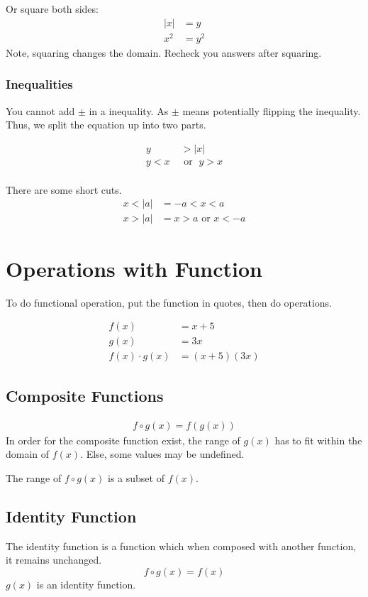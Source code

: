 \documentclass[../notes.tex]{subfiles}
\begin{document}
Or square both sides:
\begin{align*}
	|x| &= y \\
	x^2 &= y^2
\end{align*}
Note, squaring changes the domain. 
Recheck you answers after squaring.

\subsubsection{Inequalities}
You cannot add $\pm$ in a inequality.
As $\pm$ means potentially flipping the inequality.
Thus, we split the equation up into two parts.

\begin{align*}
	y &> |x| \\ 
	y < x \; &\textrm{ or } \; y > x \\
\end{align*} 

There are some short cuts.
\begin{align}
	x < |a| &= -a < x < a \\
	x > |a| &= x > a \textrm{ or } x < -a 
\end{align} 

\section{Operations with Function}
To do functional operation, put the function in quotes, then do operations.

\begin{align*}
	f(x) &= x+5 \\
	g(x) &= 3x \\
	f(x) \cdot g(x) &= (x+5)(3x)
\end{align*} 

\subsection{Composite Functions}
\begin{align*}
	f \circ g(x) = f(g(x))
\end{align*} 
In order for the composite function exist, the range of $g(x)$ has to fit within the domain of $f(x)$. 
Else, some values may be undefined.

The range of $f \circ g(x)$ is a subset of $f(x)$.

\subsection{Identity Function}
The identity function is a function which when composed with another function, it remains unchanged.
\begin{equation}
	f \circ g(x) = f(x)
\end{equation}
$g(x)$ is an identity function.
\end{document}
